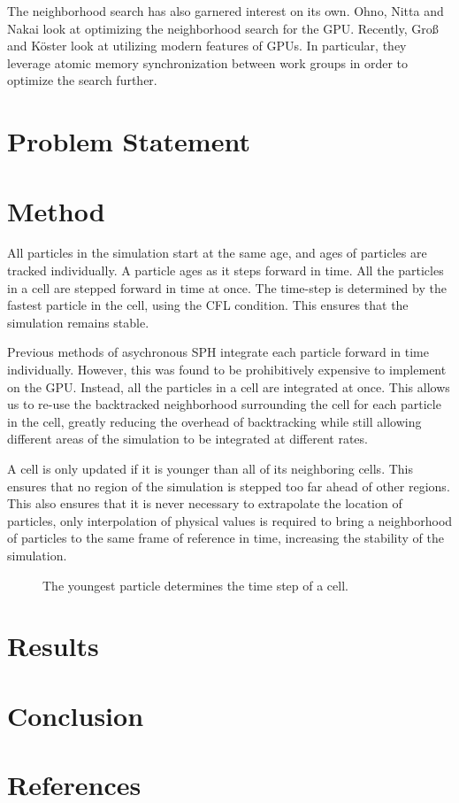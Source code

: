 \documentclass[format=acmtog,natbib=false]{acmart}
\begin{document}
The neighborhood search has also garnered interest on its own. Ohno, Nitta and Nakai look at optimizing the neighborhood search for the GPU. Recently, Gro{\ss} and K{\"o}ster look at utilizing modern features of GPUs\cite{gross2019fast}. In particular, they leverage atomic memory synchronization between work groups in order to optimize the search further.

\section{Problem Statement}
\section{Method}

All particles in the simulation start at the same age, and ages of particles are tracked individually. A particle ages as it steps forward in time. All the particles in a cell are stepped forward in time at once. The time-step is  determined by the fastest particle in the cell, using the CFL condition. This ensures that the simulation remains stable.

Previous methods of asychronous SPH integrate each particle forward in time individually. However, this was found to be prohibitively expensive to implement on the GPU. Instead, all the particles in a cell are integrated at once. This allows us to re-use the backtracked neighborhood surrounding the cell for each particle in the cell, greatly reducing the overhead of backtracking while still allowing different areas of the simulation to be integrated at different rates. 

A cell is only updated if it is younger than all of its neighboring cells. This ensures that no region of the simulation is stepped too far ahead of other regions. This also ensures that it is never necessary to extrapolate the location of particles, only interpolation of physical values is required to bring a neighborhood of particles to the same frame of reference in time, increasing the stability of the simulation.

\begin{figure}[H]
\label{fig:}
\caption{The youngest particle determines the time step of a cell.}
\end{figure}

\section{Results}
\section{Conclusion}
\section{References}

\printbibliography
\end{document}
